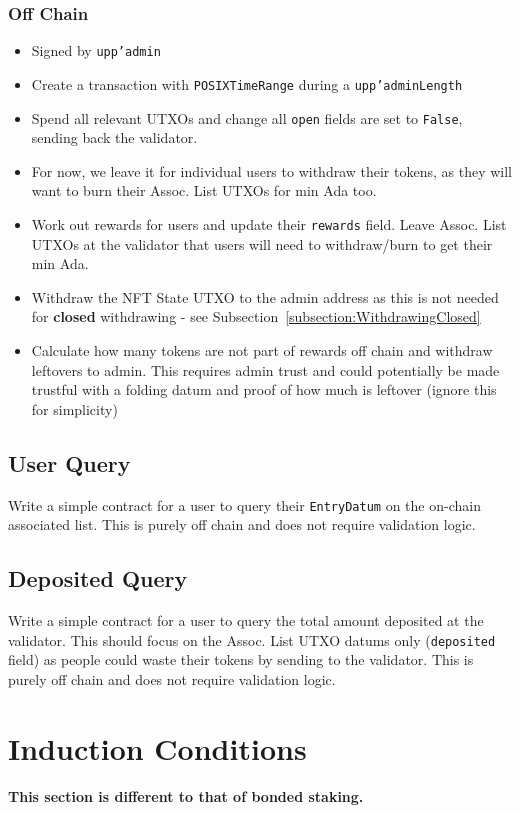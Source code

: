 \documentclass[10pt, a4paper]{article}
\theoremstyle{definition}
\begin{document}
\subsubsection{Off Chain}
\begin{itemize}
\item{Signed by \texttt{upp'admin}}
\item{Create a transaction with \texttt{POSIXTimeRange} during a \texttt{upp'adminLength}}
\item{Spend all relevant UTXOs and change all \texttt{open} fields are set to \texttt{False}, sending back the validator.}
\item{For now, we leave it for individual users to withdraw their tokens, as they will want to burn their Assoc. List UTXOs for min Ada too.}
\item{Work out rewards for users and update their \texttt{rewards} field. Leave Assoc. List UTXOs at the validator that users will need to withdraw/burn to get their min Ada.}
\item{Withdraw the NFT State UTXO to the admin address as this is not needed for \textbf{closed} withdrawing - see Subsection~\ref{subsection:WithdrawingClosed}}
\item{Calculate how many tokens are not part of rewards off chain and withdraw leftovers to admin. This requires admin trust and could potentially be made trustful with a folding datum and proof of how much is leftover (ignore this for simplicity)}
\end{itemize}

\subsection{User Query}\label{subsection:UserQuery}
Write a simple contract for a user to query their \texttt{EntryDatum} on the on-chain associated list. This is purely off chain and does not require validation logic.

\subsection{Deposited Query}\label{subsection:DepositedQuery}
Write a simple contract for a user to query the total amount deposited at the validator. This should focus on the Assoc. List UTXO datums only (\texttt{deposited} field) as people could waste their tokens by sending to the validator. This is purely off chain and does not require validation logic.

\section{Induction Conditions}\label{section:Induction}
\textbf{This section is different to that of bonded staking.}
\end{document}
